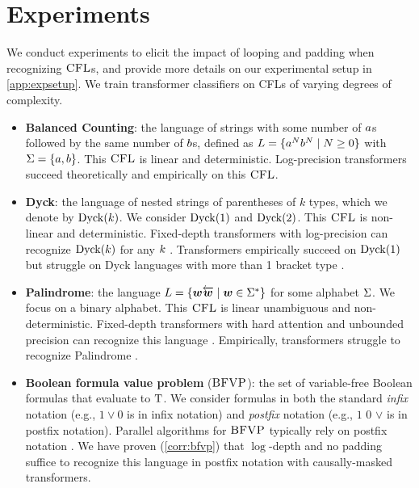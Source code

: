 \documentclass{article}
\begin{document}
\section{Experiments}\label{sec:experiments}
We conduct experiments to elicit the impact of looping and padding when recognizing ${\textsc{CFL}}$s, and provide more details on our experimental setup in \cref{app:expsetup}.
We train transformer classifiers on CFLs of varying degrees of complexity.
\begin{itemize}[noitemsep,topsep=0pt,leftmargin=15pt,parsep=0pt,partopsep=0pt]
    \item \textbf{Balanced Counting}: the language of strings with some number of ${{a}}$s followed by the same number of ${{b}}$s, defined as ${L} = \{{{a}}^{{ N}} {{b}}^{{ N}} \mid {{ N}} \geq 0\}$ with ${{ \Sigma}} = {{\{ {{a}}, {{b}} \}}}$. 
    This ${\textsc{CFL}}$ is linear and deterministic. Log-precision transformers succeed theoretically \citep{yang2024countingliketransformerscompiling} and empirically \citep{bhattamishra2020abilitylimitationstransformersrecognize} on this ${\textsc{CFL}}$.
    \item \textbf{Dyck}: the language of nested strings of parentheses of $k$ types, which we denote by $\dyck{\idxk}$. 
    We consider $\dyck{1}$ and $\dyck{2}$. 
    This ${\textsc{CFL}}$ is non-linear and deterministic. Fixed-depth transformers with log-precision can recognize $\dyck{\idxk}$ for any ${{ k}}$ \citep{hayakawa2024theoreticalanalysishierarchicallanguage}.
    Transformers empirically succeed on $\dyck{1}$ \citep{bhattamishra2020abilitylimitationstransformersrecognize} but struggle on $\mathrm{Dyck}$  languages with more than 1 bracket type \citep{ebrahimi-etal-2020-self}.
    \item \textbf{Palindrome}: the language ${L} = {{\{ {{\boldsymbol{w}}} {\overleftarrow{{{\boldsymbol{w}}}}} \mid {{\boldsymbol{w}}} \in {{{{ \Sigma}}^*}} \}}}$ for some alphabet ${{ \Sigma}}$. 
    We focus on a binary alphabet.
    This ${\textsc{CFL}}$ is linear unambiguous and non-deterministic. Fixed-depth transformers with hard attention and unbounded precision can recognize this language \citep{hao-etal-2022-formal}. Empirically, transformers struggle to recognize Palindrome \citep{butoi2025trainingneuralnetworksrecognizers}.
    \item \textbf{Boolean formula value problem} (${\textsc{BFVP}}$): the set of variable-free Boolean formulas that evaluate to ${\mathbin{\mathrm{T}}}$. 
    We consider formulas in both the standard \emph{infix} notation (e.g., $1 \lor 0$ is in infix notation) and \emph{postfix} notation (e.g., $1$ $0$ $\lor$ is in postfix notation). 
    Parallel algorithms for ${\textsc{BFVP}}$ typically rely on postfix notation \citep{buss-bfvp, buss-optimalparallel}.
    We have proven (\cref{corr:bfvp}) that $\log$-depth and no padding suffice to recognize this language in postfix notation with causally-masked transformers.
\end{itemize}
\end{document}
